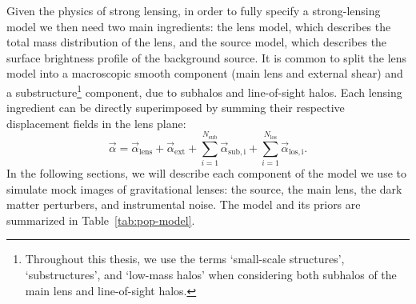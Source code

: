 %


\bigskip

Given the physics of strong lensing, in order to fully specify a strong-lensing model we then need two main ingredients: the lens model, which describes the total mass distribution of the lens, and the source model, which describes the surface brightness profile of the background source. It is common to split the lens model into a macroscopic smooth component (main lens and external shear) and a substructure\footnote{Throughout this thesis, we use the terms `small-scale structures', `substructures', and `low-mass halos' when considering both subhalos of the main lens and line-of-sight halos.} component, due to subhalos and line-of-sight halos. Each lensing ingredient can be directly superimposed by summing their respective displacement fields in the lens plane:
\begin{equation}
    \vec{\alpha} = \vec{\alpha}_\mathrm{lens} + \vec{\alpha}_\mathrm{ext} + \sum_{i=1}^{N_{\mathrm{sub}}} \vec{\alpha}_\mathrm{sub,i} + \sum_{i=1}^{N_{\mathrm{los}}} \vec{\alpha}_\mathrm{los,i}.
\end{equation}
In the following sections, we will describe each component of the model we use to simulate mock images of gravitational lenses: the source, the main lens, the dark matter perturbers, and instrumental noise. The model and its priors are summarized in Table~\ref{tab:pop-model}.

